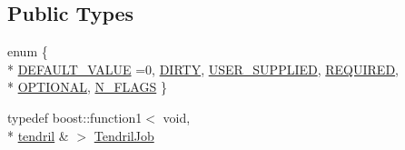 \subsection*{Public Types}
\begin{DoxyCompactItemize}
\item 
enum \{ \\*
\hyperlink{classecto_1_1tendril_a50eb3613436e99dc4dfa670141ccd91aa122dd16c5a22a6e22c7caedf7be1d92f}{D\-E\-F\-A\-U\-L\-T\-\_\-\-V\-A\-L\-U\-E} =0, 
\hyperlink{classecto_1_1tendril_a50eb3613436e99dc4dfa670141ccd91aa7ae45e8526726df642f14c19db78564d}{D\-I\-R\-T\-Y}, 
\hyperlink{classecto_1_1tendril_a50eb3613436e99dc4dfa670141ccd91aa26dbd8778d8007b845bb247f6ce87ff8}{U\-S\-E\-R\-\_\-\-S\-U\-P\-P\-L\-I\-E\-D}, 
\hyperlink{classecto_1_1tendril_a50eb3613436e99dc4dfa670141ccd91aac686a7ccc1227f1ae09d79536683136b}{R\-E\-Q\-U\-I\-R\-E\-D}, 
\\*
\hyperlink{classecto_1_1tendril_a50eb3613436e99dc4dfa670141ccd91aa4906c6f7c63b6934ea683ea05716abee}{O\-P\-T\-I\-O\-N\-A\-L}, 
\hyperlink{classecto_1_1tendril_a50eb3613436e99dc4dfa670141ccd91aa8748e76437a722b0cfb3652fefd47d67}{N\-\_\-\-F\-L\-A\-G\-S}
 \}
\item 
typedef boost\-::function1$<$ void, \\*
\hyperlink{classecto_1_1tendril}{tendril} \& $>$ \hyperlink{classecto_1_1tendril_ad312bffc767516bd2340d02cd9e218ae}{Tendril\-Job}
\end{DoxyCompactItemize}
